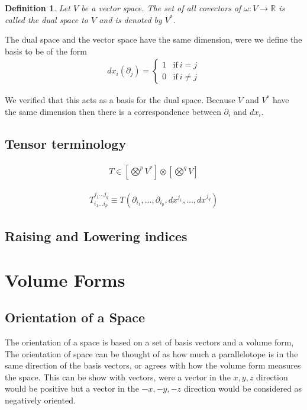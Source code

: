\documentclass[12pt]{armath}
\newtheorem{definition}{Definition}[section]
\newcommand{\ra}{\rightarrow}
\newcommand{\R}{\mathbb{R}}
\begin{document}
  \begin{definition}
    Let $V$ be a vector space. The set of all covectors of $\omega:V\ra\R$ is
    called the dual space to $V$ and is denoted by $V^*$.
  \end{definition}

  The dual space and the vector space have the same dimension, were we define the
  basis to be of the form
  \begin{align*}
    dx_i(\partial_j)=\begin{cases}1 & \text{if}\ i=j\\
    0 & \text{if}\ i\neq j\end{cases}
  \end{align*}

  We verified that this acts as a basis for the dual space. Because $V$ and $V^*$
  have the same dimension then there is a correspondence between $\partial_i$ and
  $dx_i$.

  \subsection{Tensor terminology}%
  \label{sub:tensor_terminology}
  \begin{align*}
    T\in\left[\bigotimes^p V^*\right]\otimes\left[\bigotimes^q V\right]
  \end{align*}

  \begin{align*}
    T_{i_1\ldots i_p}^{j_1\ldots j_q}\equiv
    T(\partial_{i_1},\ldots,\partial_{i_p},dx^{j_1},\ldots,dx^{j_q})
  \end{align*}

  \subsection{Raising and Lowering indices}%
  \label{sub:raising_and_lowering_indices}

  \section{Volume Forms}%
  \label{sec:volume_forms}

  \subsection{Orientation of a Space}%
  \label{sub:orientation_of_a_space}

  The orientation of a space is based on a set of basis vectors and a volume
  form, The orientation of space can be thought of as how much a parallelotope is
  in the same direction of the basis vectors, or agrees with how the volume
  form measures the space. This can be show with vectors, were a vector in the
  $x,y,z$ direction would be positive but a vector in the $-x,-y,-z$ direction
  would be considered as negatively oriented.
\end{document}

